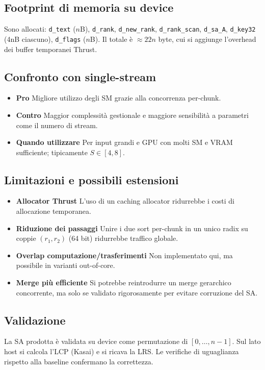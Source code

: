 		\subsection{Footprint di memoria su device}
			Sono allocati: \texttt{d\_text} ($n$B), \texttt{d\_rank}, \texttt{d\_new\_rank}, \texttt{d\_rank\_scan}, \texttt{d\_sa\_A}, \texttt{d\_key32} (4nB ciascuno), \texttt{d\_flags} ($n$B).
			Il totale è $\approx 22n$ byte, cui si aggiunge l’overhead dei buffer temporanei Thrust.
		
		\subsection{Confronto con single-stream}
			\begin{itemize}
				\item \textbf{Pro} Migliore utilizzo degli SM grazie alla concorrenza per-chunk.
				\item \textbf{Contro} Maggior complessità gestionale e maggiore sensibilità a parametri come il numero di stream.
				\item \textbf{Quando utilizzare} Per input grandi e GPU con molti SM e VRAM sufficiente; tipicamente $S\in[4,8]$.
			\end{itemize}
		
		\subsection{Limitazioni e possibili estensioni}
			\begin{itemize}
				\item \textbf{Allocator Thrust} L’uso di un caching allocator ridurrebbe i costi di allocazione temporanea.
				\item \textbf{Riduzione dei passaggi} Unire i due sort per-chunk in un unico radix su coppie $(r_1,r_2)$ (64 bit) ridurrebbe traffico globale.
				\item \textbf{Overlap computazione/trasferimenti} Non implementato qui, ma possibile in varianti out-of-core.
				\item \textbf{Merge più efficiente} Si potrebbe reintrodurre un merge gerarchico concorrente, ma solo se validato rigorosamente per evitare corruzione del SA\@.
			\end{itemize}
		
		\subsection{Validazione}
			La SA prodotta è validata su device come permutazione di $[0, \dots, n{-}1]$.
			Sul lato host si calcola l’LCP (Kasai) e si ricava la LRS. Le verifiche di uguaglianza rispetto alla baseline confermano la correttezza.